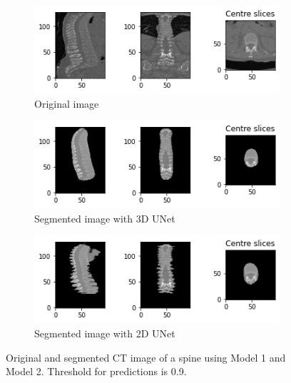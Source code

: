 
\begin{figure}[ht!]
\centering
\begin{subfigure}[b]{0.70\textwidth}
   \includegraphics[width=1\linewidth]{images/results_3/original.png}
   \caption{Original image}
   \label{fig:Ng1} 
\end{subfigure}

\begin{subfigure}[b]{0.70\textwidth}
   \includegraphics[width=1\linewidth]{images/results_3/3D.png}
   \caption{Segmented image with 3D UNet}
   \label{fig:Ng2}
\end{subfigure}

\begin{subfigure}[b]{0.70\textwidth}
   \includegraphics[width=1\linewidth]{images/results_3/2D.png}
   \caption{Segmented image with 2D UNet}
   \label{fig:Ng3}
\end{subfigure}

\caption[Comparison UNet 3D and UNet 2D]{Original and segmented CT image of a spine using Model 1 and Model 2. Threshold for predictions is 0.9.}
\label{fig:unet2D-spine}
\end{figure}

